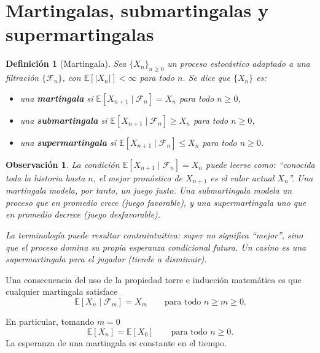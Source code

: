 \documentclass[12pt]{book}
\newtheorem{definition}{Definición}[chapter]
\newtheorem{remark}{Observación}[chapter]
\begin{document}
\section{Martingalas, submartingalas y supermartingalas}

\begin{definition}[Martingala]
    Sea $\{X_n\}_{n \ge 0}$ un proceso estocástico adaptado a una filtración $\{\mathcal{F}_n\}$, con $\mathbb{E}[|X_n|] < \infty$ para todo $n$. Se dice que $\{X_n\}$ es:
    \begin{itemize}
        \item una \textbf{martingala} si $\mathbb{E}[X_{n+1} \mid \mathcal{F}_n] = X_n$ para todo $n \ge 0$,
        \item una \textbf{submartingala} si $\mathbb{E}[X_{n+1} \mid \mathcal{F}_n] \ge X_n$ para todo $n \ge 0$,
        \item una \textbf{supermartingala} si $\mathbb{E}[X_{n+1} \mid \mathcal{F}_n] \le X_n$ para todo $n \ge 0$.
    \end{itemize}
\end{definition}

\begin{remark}
    La condición $\mathbb{E}[X_{n+1} \mid \mathcal{F}_n] = X_n$ puede leerse como: ``conocida toda la historia hasta $n$, el mejor pronóstico de $X_{n+1}$ es el valor actual $X_n$''. Una martingala modela, por tanto, un \emph{juego justo}. Una submartingala modela un proceso que en promedio crece (juego favorable), y una supermartingala uno que en promedio decrece (juego desfavorable).

    La terminología puede resultar contraintuitiva: \emph{super} no significa ``mejor'', sino que \emph{el proceso domina su propia esperanza condicional futura}. Un casino es una supermartingala para el jugador (tiende a disminuir).
\end{remark}

Una consecuencia del uso de la propiedad torre e inducción matemática es que cualquier martingala satisface
\[
    \mathbb{E}[X_n \mid \mathcal{F}_m] = X_m \qquad \text{para todo } n \ge m \ge 0.
\]

En particular, tomando $m = 0$
\[
    \mathbb{E}[X_n] = \mathbb{E}[X_0] \qquad \text{para todo } n \ge 0.
\]
La esperanza de una martingala es constante en el tiempo.

\end{document}
